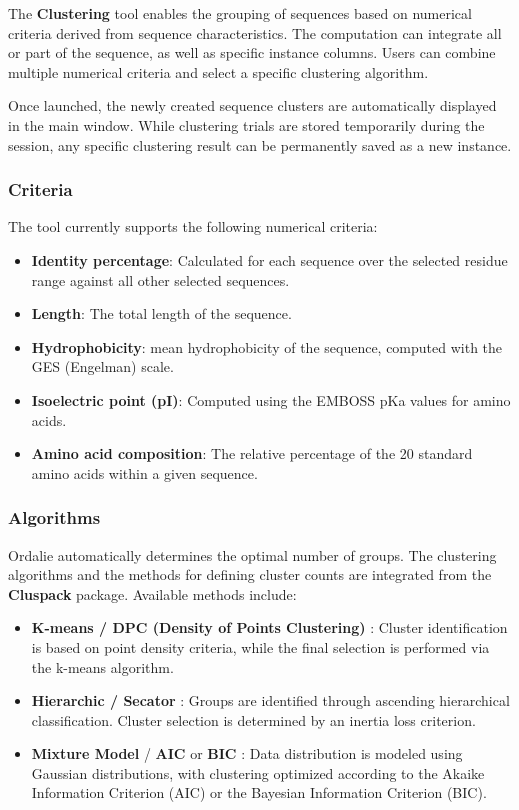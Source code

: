 \documentclass[a4paper]{article}
\begin{document}
The \textbf{Clustering} tool enables the grouping of sequences based on numerical criteria derived from sequence characteristics. The computation can integrate all or part of the sequence, as well as specific instance columns. Users can combine multiple numerical criteria and select a specific clustering algorithm. 

Once launched, the newly created sequence clusters are automatically displayed in the main window. While clustering trials are stored temporarily during the session, any specific clustering result can be permanently saved as a new instance.

\subsubsection{Criteria}
The tool currently supports the following numerical criteria:

\begin{itemize}
    \item \textbf{Identity percentage}: Calculated for each sequence over the selected residue range against all other selected sequences.
    \item \textbf{Length}: The total length of the sequence.
    \item \textbf{Hydrophobicity}: mean hydrophobicity of the sequence, computed with the GES (Engelman) scale.
    \item \textbf{Isoelectric point (pI)}: Computed using the EMBOSS pKa values for amino acids.
    \item \textbf{Amino acid composition}: The relative percentage of the 20 standard amino acids within a given sequence.
\end{itemize}

\subsubsection{Algorithms}
Ordalie automatically determines the optimal number of groups. The clustering algorithms and the methods for defining cluster counts are integrated from the \textbf{Cluspack} package. Available methods include:

\begin{itemize}
    \item \textbf{K-means / DPC (Density of Points Clustering)} \cite{dpc}: Cluster identification is based on point density criteria, while the final selection is performed via the k-means algorithm.
    \item \textbf{Hierarchic / Secator} \cite{secator}: Groups are identified through ascending hierarchical classification. Cluster selection is determined by an inertia loss criterion.
    \item \textbf{Mixture Model} \cite{mixturemodel} / \textbf{AIC} \cite{aic} or \textbf{BIC} \cite{bic}: Data distribution is modeled using Gaussian distributions, with clustering optimized according to the Akaike Information Criterion (AIC) or the Bayesian Information Criterion (BIC).
\end{itemize}
\end{document}
